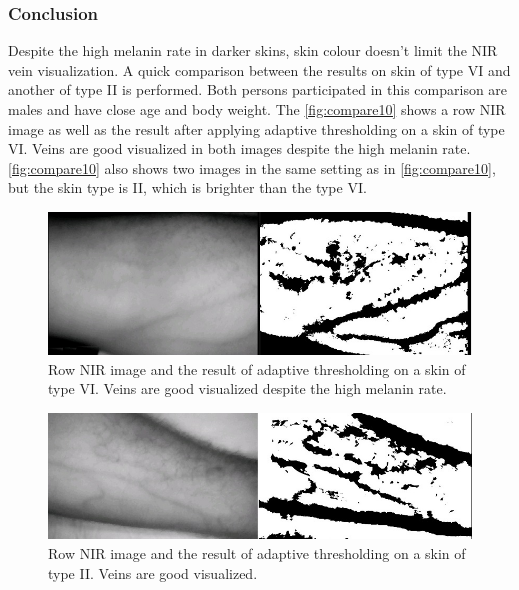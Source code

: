 \subsubsection{Conclusion}
Despite the high melanin rate in darker skins, skin colour doesn’t limit the NIR vein visualization. A quick comparison between the results on skin of type VI and another of type II is performed. Both persons participated in this comparison are males and have close age and body weight.
The \autoref{fig:compare10} shows a row NIR image as well as the result after applying adaptive thresholding on a skin of type VI. Veins are good visualized in both images despite the high melanin rate. \autoref{fig:compare10} also shows two images in the same setting as in \autoref{fig:compare10}, but the skin type is II, which is brighter than the type VI.





\begin{figure}[H]
\centering
\includegraphics[scale=0.8]{figures/compare10.jpg}
\caption[Row NIR image and the result of adaptive thresholding on a skin of type VI]{Row NIR image and the result of adaptive thresholding on a skin of type VI. Veins are good visualized despite the high melanin rate.}\label{fig:compare10}
\end{figure}

\begin{figure}[H]
\centering
\includegraphics[scale=0.8]{figures/compare11.JPG}
\caption[Row NIR image and the result of adaptive thresholding on a skin of type II]{Row NIR image and the result of adaptive thresholding on a skin of type II. Veins are good visualized.}\label{fig:compare11}
\end{figure}

